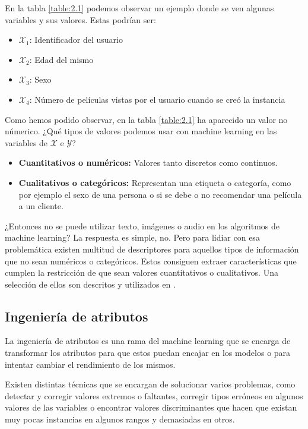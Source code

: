 En la tabla \ref{table:2.1} podemos observar un ejemplo donde se ven algunas variables y sus valores. Estas podrían ser:

\begin{itemize}
\item[\textbullet]$\mathcal{X}_{1}$: Identificador del usuario
\item[\textbullet]$\mathcal{X}_{2}$: Edad del mismo
\item[\textbullet]$\mathcal{X}_{3}$: Sexo
\item[\textbullet]$\mathcal{X}_{4}$: Número de películas vistas por el usuario cuando se creó la instancia
\end{itemize}

Como hemos podido observar, en la tabla \ref{table:2.1} ha aparecido un valor no númerico. ¿Qué tipos de valores podemos usar con machine learning en las variables de $\mathcal{X}$ e $\mathcal{Y}$?

\begin{itemize}
\item[\textbullet]\textbf{Cuantitativos o numéricos:} Valores tanto discretos como continuos.
\item[\textbullet]\textbf{Cualitativos o categóricos:} Representan una etiqueta o categoría, como por ejemplo el sexo de una persona o si se debe o no recomendar una película a un cliente.
\end{itemize}

¿Entonces no se puede utilizar texto, imágenes o audio en los algoritmos de machine learning? La respuesta es simple, no. Pero para lidiar con esa problemática existen multitud de descriptores para aquellos tipos de información que no sean numéricos o categóricos. Estos consiguen extraer características que cumplen la restricción de que sean valores cuantitativos o cualitativos. Una selección de ellos son descritos y utilizados en \cite{richert2013building}.

\subsection{Ingeniería de atributos} \label{subsec:2.2.1}

La ingeniería de atributos es una rama del machine learning que se encarga de transformar los atributos para que estos puedan encajar en los modelos o para intentar cambiar el rendimiento de los mismos.

Existen distintas técnicas que se encargan de solucionar varios problemas, como detectar y corregir valores extremos o faltantes, corregir tipos erróneos en algunos valores de las variables o encontrar valores discriminantes que hacen que existan muy pocas instancias en algunos rangos y demasiadas en otros.

